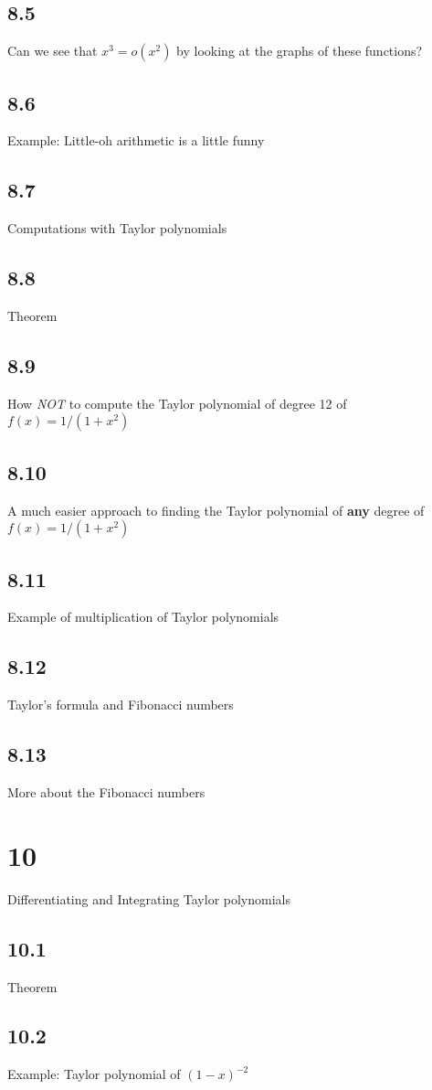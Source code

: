 \subsection{8.5}{Can we see that $x^3=o (x^2)$ by looking at the graphs of these functions?}
\subsection{8.6}{Example: Little-oh arithmetic is a little funny}
\subsection{8.7}{Computations with Taylor polynomials}
\subsection{8.8}{Theorem}
\subsection{8.9}{How {\it NOT} to compute the Taylor polynomial of degree 12 of $f(x)=1/ (1+x^2)$}
\subsection{8.10}{A much easier approach to finding the Taylor polynomial of {\bf any} degree of $f(x)=1/ (1+x^2)$}
\subsection{8.11}{Example of multiplication of Taylor polynomials}
\subsection{8.12}{Taylor's formula and Fibonacci numbers}
\subsection{8.13}{More about the Fibonacci numbers}

\section{10}{Differentiating and Integrating Taylor polynomials}
\subsection{10.1}{Theorem}
\subsection{10.2}{Example: Taylor polynomial of $(1-x)^{-2}$}
